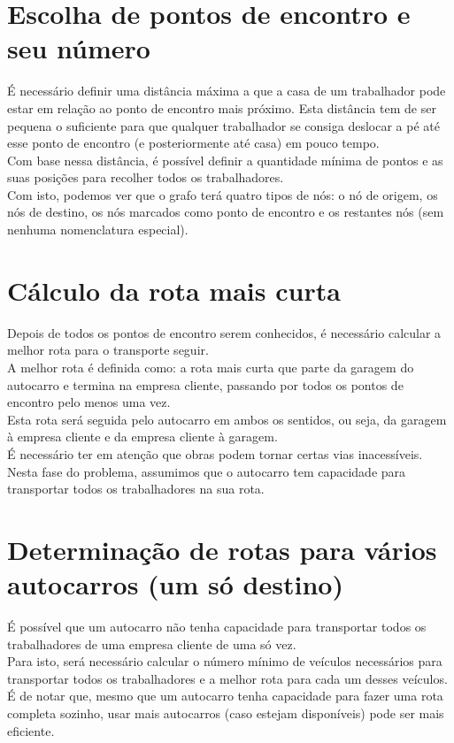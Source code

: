 \documentclass{report}
\begin{document}
  \section{Escolha de pontos de encontro e seu número}
    É necessário definir uma distância máxima a que a casa de um trabalhador
    pode estar em relação ao ponto de encontro mais próximo. Esta distância
    tem de ser pequena o suficiente para que qualquer trabalhador se consiga
    deslocar a pé até esse ponto de encontro (e posteriormente até casa) em
    pouco tempo.\\
    Com base nessa distância, é possível definir a quantidade mínima de pontos
    e as suas posições para recolher todos os trabalhadores.\\
    \newline
    Com isto, podemos ver que o grafo terá quatro tipos de nós: o nó de origem,
    os nós de destino, os nós marcados como ponto de encontro e os restantes
    nós (sem nenhuma nomenclatura especial).

  \section{Cálculo da rota mais curta}
    Depois de todos os pontos de encontro serem conhecidos, é necessário
    calcular a melhor rota para o transporte seguir.\\
    A melhor rota é definida como: a rota mais curta que parte da garagem do
    autocarro e termina na empresa cliente, passando por todos os pontos de
    encontro pelo menos uma vez.\\
    Esta rota será seguida pelo autocarro em ambos os sentidos, ou seja, da garagem
    à empresa cliente e da empresa cliente à garagem.\\
    É necessário ter em atenção que obras podem tornar certas vias inacessíveis.
    \newline
    Nesta fase do problema, assumimos que o autocarro tem capacidade para
    transportar todos os trabalhadores na sua rota.

  \section{Determinação de rotas para vários autocarros (um só destino)}
    É possível que um autocarro não tenha capacidade para transportar todos os
    trabalhadores de uma empresa cliente de uma só vez.\\
    Para isto, será necessário calcular o número mínimo de veículos necessários
    para transportar todos os trabalhadores e a melhor rota para cada um desses
    veículos.\\
    \newline
    É de notar que, mesmo que um autocarro tenha capacidade para fazer uma rota
    completa sozinho, usar mais autocarros (caso estejam disponíveis) pode ser
    mais eficiente.
\end{document}

